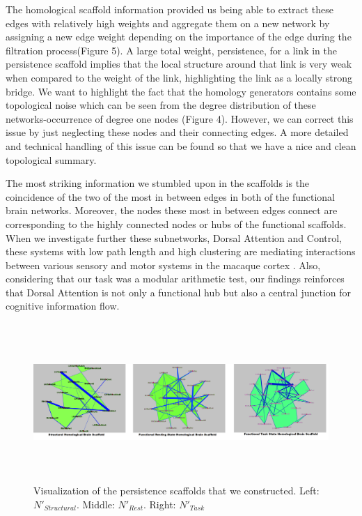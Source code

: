 \documentclass[9pt,twocolumn,twoside,lineno]{pnas-new}
\begin{document}
The homological scaffold information provided us being able to extract these edges with relatively high weights and aggregate them on a new network by assigning a new edge weight depending on the importance of the edge during the filtration process(Figure 5). A large total weight, persistence, for a link in the persistence scaffold implies that the local structure around that link is very weak when compared to the weight of the link, highlighting the link as a locally strong bridge. 
We want to highlight the fact that the homology generators contains some topological noise which can be seen from the degree distribution of these networks-occurrence of degree one nodes (Figure 4). However, we can correct this issue by just neglecting these nodes and their connecting edges. A more detailed and technical handling of this issue can be found \cite{optimalc1,optimalc2} so that we have a nice and clean topological summary. 

The most striking information we stumbled upon in the scaffolds is the coincidence of the two of the most in between edges in both of the functional brain networks. Moreover, the nodes these most in between edges connect are corresponding to the highly connected nodes or hubs of the functional scaffolds. When we investigate further these subnetworks, Dorsal Attention and Control, these systems with low path length and high clustering are mediating interactions between various sensory and motor systems in the macaque cortex \cite{smallworld1,smallworld3}. Also, considering that our task was a modular arithmetic test, our findings reinforces that Dorsal Attention is not only a functional hub but also a central junction for cognitive information flow.

\begin{figure}%
\centering
\includegraphics[width=18cm,height=6cm]{strucscaf.png}
\caption{Visualization of the persistence scaffolds that we constructed. Left: $N'_{Structural}$. Middle: $N'_{Rest}$. Right: $N'_{Task}$  }
\end{figure}
\end{document}
